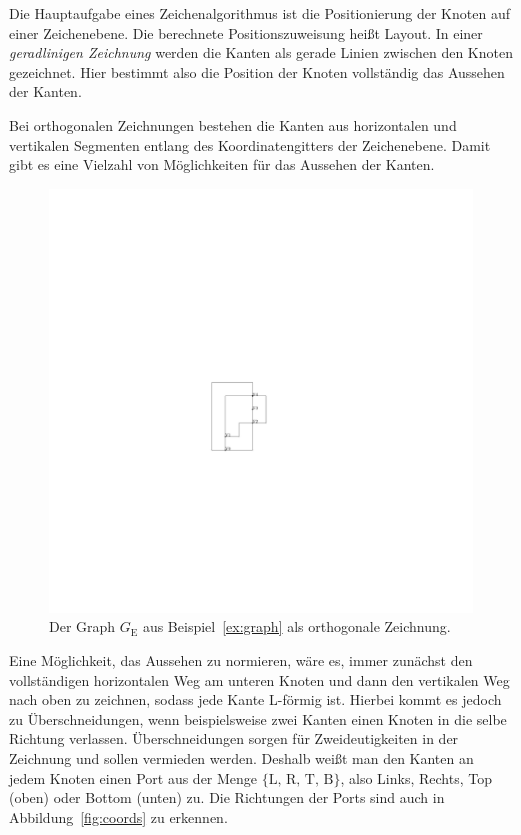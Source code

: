 \documentclass[a4paper]{scrreprt}
\theoremstyle{definition}
\begin{document}
Die Hauptaufgabe eines Zeichenalgorithmus ist die Positionierung der Knoten auf einer Zeichenebene. Die berechnete Positionszuweisung heißt Layout. In einer \emph{geradlinigen Zeichnung} werden die Kanten als gerade Linien zwischen den Knoten gezeichnet. Hier bestimmt also die Position der Knoten vollständig das Aussehen der Kanten.

Bei orthogonalen Zeichnungen bestehen die Kanten aus horizontalen und vertikalen Segmenten entlang des Koordinatengitters der Zeichenebene. Damit gibt es eine Vielzahl von Möglichkeiten für das Aussehen der Kanten.

\begin{figure}[h]
  \centering
  \includegraphics{exampleA_orthogonalNocompress}
  \caption{Der Graph $G_\text{E}$ aus Beispiel~\ref{ex:graph} als orthogonale Zeichnung.}
  \label{fig:exampleAorthogonalNocompress}
\end{figure}


Eine Möglichkeit, das Aussehen zu normieren, wäre es, immer zunächst den vollständigen horizontalen Weg am unteren Knoten und dann den vertikalen Weg nach oben zu zeichnen, sodass jede Kante L-förmig ist. Hierbei kommt es jedoch zu Überschneidungen, wenn beispielsweise zwei Kanten einen Knoten in die selbe Richtung verlassen. Überschneidungen sorgen für Zweideutigkeiten in der Zeichnung und sollen vermieden werden. Deshalb weißt man den Kanten an jedem Knoten einen Port aus der Menge $\{\text{L, R, T, B}\}$, also Links, Rechts, Top (oben) oder Bottom (unten) zu. Die Richtungen der Ports sind auch in Abbildung~\ref{fig:coords} zu erkennen.
\\
\end{document}
